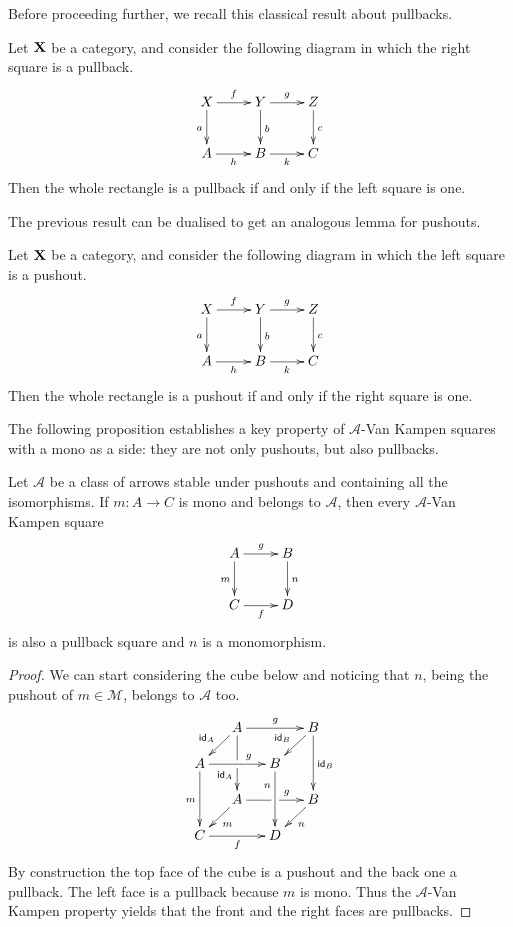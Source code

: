 Before proceeding further, we recall this classical result about pullbacks.

\begin{lemma}\label{lem:pb1}
	Let $\textbf {\textup{X}}$ be a category, and consider the following diagram 	in which the right square is a pullback.
	\[\xymatrix{X \ar[d]_{a} \ar[r]^{f}& \ar[r]^{g} Y \ar[d]^{b}& Z \ar[d]^{c}\\ A \ar[r]_{h}& B \ar[r]_{k}& C}\]
	Then the whole rectangle is a pullback if and only if the left square is one.
\end{lemma}

The previous result can be dualised to get an analogous lemma for pushouts.

\begin{lemma}\label{lem:po1}
	Let $\textbf {\textup{X}}$ be a category, and consider the following diagram 	in which the left square is a pushout.
	\[\xymatrix{X \ar[d]_{a} \ar[r]^{f}& \ar[r]^{g} Y \ar[d]^{b}& Z \ar[d]^{c}\\ A \ar[r]_{h}& B \ar[r]_{k}& C}\]
	Then the whole rectangle is a pushout if and only if the right square is one.
\end{lemma}

The following proposition establishes a key property of $\mathcal{A}$-Van Kampen squares with a mono as a side: they are not only pushouts, but also pullbacks.
\begin{proposition}\label{prop:pbpo} Let $\mathcal{A}$ be a class of arrows stable under pushouts and containing all the isomorphisms.  If $m\colon A\to C$ is mono and belongs to $\mathcal{A}$, then every $\mathcal{A}$-Van Kampen square
	\[\xymatrix{A\ar[r]^{g} \ar[d]_{m} & B \ar[d]^{n} \\ C \ar[r]_{f}  & D}\]
	is also a pullback square and $n$ is a monomorphism.
\end{proposition}
\begin{proof} We can start considering the cube below and noticing that $n$, being the pushout of $m\in \mathcal{M}$, belongs to $\mathcal{A}$ too.
	\[\xymatrix@C=13pt@R=13pt{&A\ar[dd]|\hole_(.65){\id{A}}\ar[rr]^{g} \ar[dl]_{\id{A}} && B \ar[dd]^{\id{B}} \ar[dl]_{\id{B}} \\ A  \ar[dd]_{m}\ar[rr]^(.65){g} & & B \ar[dd]_(.3){n}\\&A\ar[rr]|\hole^(.65){g} \ar[dl]^{m} && B \ar[dl]^{n} \\C \ar[rr]_{f} & & D}\]
	By construction the top face of the cube is a pushout and the back one a pullback. The left face is a pullback because $m$ is mono. Thus the $\mathcal{A}$-Van Kampen property yields that the front and the right faces are pullbacks. 
\end{proof}

